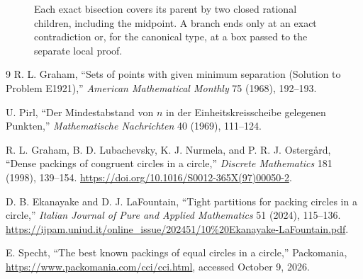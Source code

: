 \documentclass[11pt]{article}
\theoremstyle{definition}
\begin{document}
\begin{figure}[htbp]
\centering
{}
\caption{Each exact bisection covers its parent by two closed rational children, including the midpoint. A branch ends only at an exact contradiction or, for the canonical type, at a box passed to the separate local proof.}
\label{fig:branch-tree}
\end{figure}

\begin{thebibliography}{9}
R. L. Graham, ``Sets of points with given minimum separation (Solution to Problem E1921),''
\emph{American Mathematical Monthly} 75 (1968), 192--193.

U. Pirl, ``Der Mindestabstand von $n$ in der Einheitskreisscheibe gelegenen Punkten,''
\emph{Mathematische Nachrichten} 40 (1969), 111--124.

R. L. Graham, B. D. Lubachevsky, K. J. Nurmela, and P. R. J. Ostergård,
``Dense packings of congruent circles in a circle,'' \emph{Discrete Mathematics} 181 (1998), 139--154.
\url{https://doi.org/10.1016/S0012-365X(97)00050-2}.

D. B. Ekanayake and D. J. LaFountain, ``Tight partitions for packing circles in a circle,''
\emph{Italian Journal of Pure and Applied Mathematics} 51 (2024), 115--136.
\url{https://ijpam.uniud.it/online_issue/202451/10%20Ekanayake-LaFountain.pdf}.

E. Specht, ``The best known packings of equal circles in a circle,'' Packomania,
\url{https://www.packomania.com/cci/cci.html}, accessed October 9, 2026.
\end{thebibliography}
\end{document}
